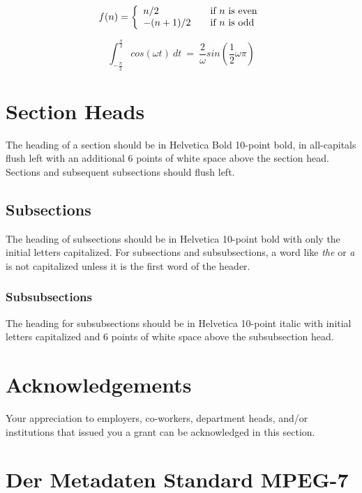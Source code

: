 	\begin{equation}
		f(n) = \left\{ 
			\begin{array}{l l}
			n/2 & \quad \text{if $n$ is even}\\
			-(n+1)/2 & \quad \text{if $n$ is odd}\\
		\end{array} \right.
		\label{myequation}
	\end{equation}
	
	\begin{equation}
		\int_{- \frac{\pi}{2}}^{\frac{\pi}{2}}cos(\omega t)~dt
		~=~
		\frac{2}{\omega}sin( \frac{1}{2}\omega \pi)
		\label{myequation2}
	\end{equation}
	
	\section{Section Heads}
	The heading of a section should be in Helvetica Bold 10-point bold, in
	all-capitals flush left with an additional 6 points of white space above
	the section head. Sections and subsequent subsections should flush left.
	
	\subsection{Subsections}
	The heading of subsections should be in Helvetica 10-point bold with
	only the initial letters capitalized. For subsections and subsubsections,
	a word like \emph{the} or \emph{a} is not capitalized unless it is the
	first word of the header.
	
	\subsubsection{Subsubsections}
	The heading for subsubsections should be in Helvetica 10-point italic
	with initial letters capitalized and 6 points of white space above the
	subsubsection head.
	
	\section{Acknowledgements}
	Your appreciation to employers, co-workers, department heads, and/or
	institutions that issued you a grant can be acknowledged in this section.
	\newpage
	
	\section {Der Metadaten Standard MPEG-7} 
	
